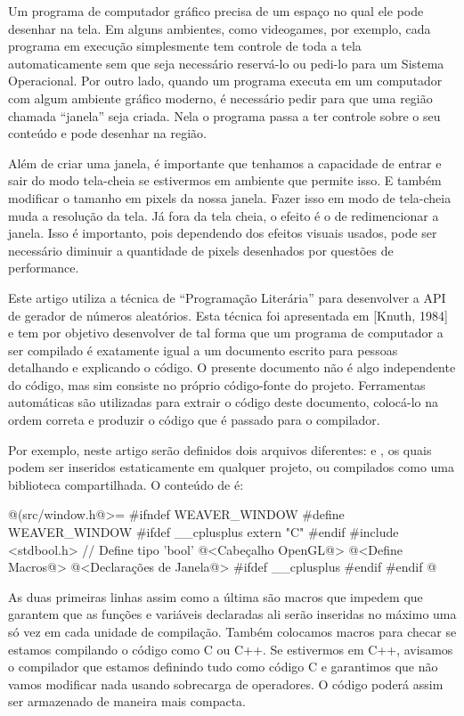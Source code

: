
Um programa de computador gráfico precisa de um espaço no qual ele
pode desenhar na tela. Em alguns ambientes, como videogames, por
exemplo, cada programa em execução simplesmente tem controle de toda a
tela automaticamente sem que seja necessário reservá-lo ou pedi-lo
para um Sistema Operacional. Por outro lado, quando um programa
executa em um computador com algum ambiente gráfico moderno, é
necessário pedir para que uma região chamada ``janela'' seja
criada. Nela o programa passa a ter controle sobre o seu conteúdo e
pode desenhar na região.

Além de criar uma janela, é importante que tenhamos a capacidade de
entrar e sair do modo tela-cheia se estivermos em ambiente que permite
isso. E também modificar o tamanho em pixels da nossa janela. Fazer
isso em modo de tela-cheia muda a resolução da tela. Já fora da tela
cheia, o efeito é o de redimencionar a janela. Isso é importanto, pois
dependendo dos efeitos visuais usados, pode ser necessário diminuir a
quantidade de pixels desenhados por questões de performance.


Este artigo utiliza a técnica de ``Programação Literária'' para
desenvolver a API de gerador de números aleatórios. Esta técnica foi
apresentada em [Knuth, 1984] e tem por objetivo desenvolver
 de tal forma que um programa de computador a ser compilado
é exatamente igual a um documento escrito para pessoas detalhando e
explicando o código. O presente documento não é algo independente do
código, mas sim consiste no próprio código-fonte do projeto.
Ferramentas automáticas são utilizadas para extrair o código deste
documento, colocá-lo na ordem correta e produzir o código que é
passado para o compilador.

Por exemplo, neste artigo serão definidos dois arquivos
diferentes:  e , os quais
podem ser inseridos estaticamente em qualquer projeto, ou compilados
como uma biblioteca compartilhada. O conteúdo de 
é:

\iniciocodigo
@(src/window.h@>=
#ifndef WEAVER_WINDOW
#define WEAVER_WINDOW
#ifdef __cplusplus
extern "C" {
#endif
#include <stdbool.h> // Define tipo 'bool'
@<Cabeçalho OpenGL@>
@<Define Macros@>
@<Declarações de Janela@>
#ifdef __cplusplus
}
#endif
#endif
@
\fimcodigo

As duas primeiras linhas assim como a última são macros que impedem
que garantem que as funções e variáveis declaradas ali serão inseridas
no máximo uma só vez em cada unidade de compilação. Também colocamos
macros para checar se estamos compilando o código como C ou C++. Se
estivermos em C++, avisamos o compilador que estamos definindo tudo
como código C e garantimos que não vamos modificar nada usando
sobrecarga de operadores. O código poderá assim ser armazenado de
maneira mais compacta.


